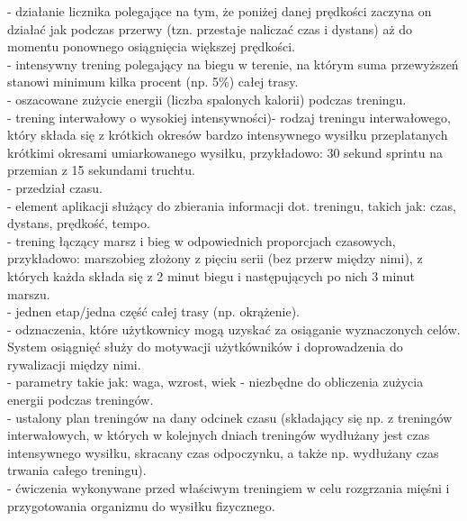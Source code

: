 	\noindent{} - działanie licznika polegające na tym, że poniżej danej prędkości zaczyna on działać jak podczas przerwy (tzn. przestaje naliczać czas i dystans) aż do momentu ponownego osiągnięcia większej prędkości.\\
	 - intensywny trening polegający na biegu w terenie, na którym suma przewyższeń stanowi minimum kilka procent (np. 5\%) całej trasy.\\
	 - oszacowane zużycie energii (liczba spalonych kalorii) podczas treningu.\\
	 - trening interwałowy o wysokiej intensywności)- rodzaj treningu interwałowego, który składa się z krótkich okresów bardzo intensywnego wysiłku przeplatanych krótkimi okresami umiarkowanego wysiłku, przykładowo: 30 sekund sprintu na przemian z 15 sekundami truchtu.\\
	 - przedział czasu.\\
	 - element aplikacji służący do zbierania informacji dot. treningu, takich jak: czas, dystans, prędkość, tempo.\\
	 - trening łączący marsz i bieg w odpowiednich proporcjach czasowych, przykładowo: marszobieg złożony z pięciu serii (bez przerw między nimi), z których każda składa się z 2 minut biegu i następujących po nich 3 minut marszu.\\
	 - jednen etap/jedna część całej trasy (np. okrążenie).\\
	 - odznaczenia, które użytkownicy mogą uzyskać za osiąganie wyznaczonych celów. System osiągnięć służy do motywacji użytkówników i doprowadzenia do rywalizacji między nimi.\\
	 - parametry takie jak: waga, wzrost, wiek - niezbędne do obliczenia zużycia energii podczas treningów.\\
	 - ustalony plan treningów na dany odcinek czasu (składający się np. z treningów interwałowych, w których w kolejnych dniach treningów wydłużany jest czas intensywnego wysiłku, skracany czas odpoczynku, a także np. wydłużany czas trwania całego treningu).\\
	 - ćwiczenia wykonywane przed właściwym treningiem w celu rozgrzania mięśni i przygotowania organizmu do wysiłku fizycznego.\\
